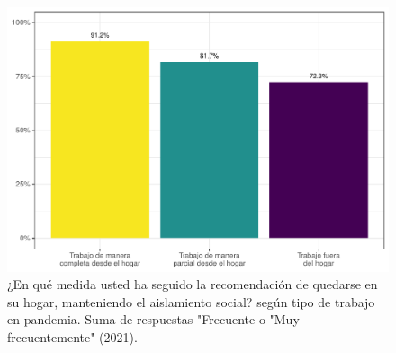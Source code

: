 \documentclass[
  12pt,
]{book}
\begin{document}
\begin{figure}

{\centering \includegraphics{reporte-elsoc_files/figure-latex/dist-telet-1} 

}

\caption{¿En qué medida usted ha seguido la recomendación de quedarse en su hogar, manteniendo el aislamiento social? según tipo de trabajo en pandemia. Suma de respuestas "Frecuente o "Muy frecuentemente" (2021).}\label{fig:dist-telet}
\end{figure}
\end{document}
